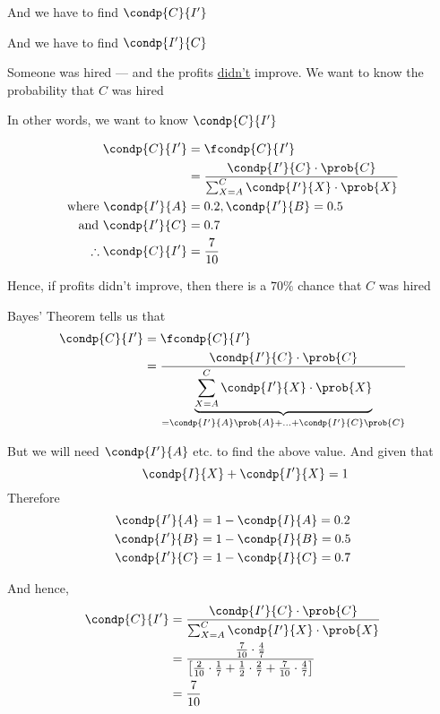 \documentclass[14pt,fleqn]{extarticle}
\newcommand\pa{\frac{1}{7}}
\newcommand\pb{\frac{2}{7}}
\newcommand\pc{\frac{4}{7}}
\begin{document}
\begin{problem}
\begin{step}
\begin{options}
      And we have to find $\condp{C}{I'}$ 
     \incorrect
     
     And we have to find $\condp{I'}{C}$ 
        
    \end{options} 
     \reason 
       
     Someone was hired --- and the profits \underline{didn't} improve. We want to know 
     the probability that $C$ was hired \newline 
     
     In other words, we want to know $\condp{C}{I'}$    
\end{step}

\begin{step}
  \begin{options} 
     \correct 
      
      \begin{align}
	\condp{C}{I'} &= \fcondp{C}{I'} \\
	&= \dfrac{\condp{I'}{C}\cdot\prob{C}}{\sum_{X = A}^C \condp{I'}{X}\cdot\prob{X}} \\
	\text{where } \condp{I'}{A} &= 0.2, \condp{I'}{B} = 0.5 \\
	\text{and }\condp{I'}{C} &= 0.7  \\
	\therefore \condp{C}{I'} &= \frac{7}{10} 
\end{align} 

Hence, if profits didn't improve, then there is a $70\%$ chance that $C$ was hired 
     
    \end{options} 
     \reason 
     
     Bayes' Theorem tells us that 
     \begin{align}
     \condp{C}{I'} &= \fcondp{C}{I'} \\
     &= \dfrac{\condp{I'}{C}\cdot\prob{C}}{\underbrace{\sum_{X=A}^C\condp{I'}{X}\cdot\prob{X}}_{=\condp{I'}{A}\prob{A} + \ldots + \condp{I'}{C}\prob{C}}}
\end{align}

But we will need $\condp{I'}{A}$ etc. to find the above value. And given that 
\[ \qquad \condp{I}{X} + \condp{I'}{X} = 1 \] 
Therefore
\begin{align}
\condp{I'}{A} &= 1-\condp{I}{A} = 0.2 \\
\condp{I'}{B} &= 1-\condp{I}{B} = 0.5 \\
\condp{I'}{C} &= 1-\condp{I}{C} = 0.7 
\end{align}

And hence, 
\begin{align}
\condp{C}{I'} &= \dfrac{\condp{I'}{C}\cdot\prob{C}}{\sum_{X=A}^C\condp{I'}{X}\cdot\prob{X}} \\
&= \dfrac{\frac{7}{10}\cdot\pc}{\left[\frac{2}{10}\cdot\pa + \frac{1}{2}\cdot\pb + \frac{7}{10}\cdot\pc \right]} \\
&= \frac{7}{10} 
\end{align}
       
\end{step}
\end{problem} 
\end{document}
